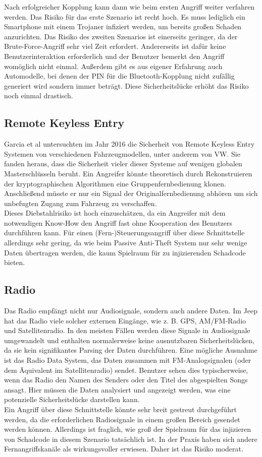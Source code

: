 Nach erfolgreicher Kopplung kann dann wie beim ersten Angriff weiter verfahren werden. 
Das Risiko für das erste Szenario ist recht hoch. Es muss lediglich ein Smartphone mit einem Trojaner infiziert werden, um bereits großen Schaden anzurichten. Das Risiko des zweiten Szenarios ist einerseits geringer, da der Brute-Force-Angriff sehr viel Zeit erfordert. Andererseits ist dafür keine Benutzerinteraktion erforderlich und der Benutzer bemerkt den Angriff womöglich nicht einmal. Außerdem gibt es aus eigener Erfahrung auch Automodelle, bei denen der PIN für die Bluetooth-Kopplung nicht zufällig generiert wird sondern immer \grqq{} beträgt. Diese Sicherheitslücke erhöht das Risiko noch einmal drastisch.


\subsection{Remote Keyless Entry}
Garcia et al untersuchten im Jahr 2016 die Sicherheit von Remote Keyless Entry Systemen von verschiedenen Fahrzeugmodellen, unter anderem von VW. Sie fanden heraus, dass die Sicherheit vieler dieser Systeme auf wenigen globalen Masterschlüsseln beruht. Ein Angreifer könnte theoretisch durch Rekonstruieren der kryptographischen Algorithmen eine Gruppenfernbedienung klonen. Anschließend müsste er nur ein Signal der Originalfernbedienung abhören um sich unbefugten Zugang zum Fahrzeug zu verschaffen. \cite{Garcia.2016}\\
Dieses Diebstahlrisiko ist hoch einzuschätzen, da ein Angreifer mit dem notwendigen Know-How den Angriff fast ohne Kooperation des Benutzers durchführen kann. Für einen (Fern-)Steuerungsangriff über diese Schnittstelle allerdings sehr gering, da wie beim Passive Anti-Theft System nur sehr wenige Daten übertragen werden, die kaum Spielraum für zu injizierenden Schadcode bieten.

\subsection{Radio}
Das Radio empfängt nicht nur Audiosignale, sondern auch andere Daten. Im Jeep hat das Radio viele solcher externen Eingänge, wie z. B. GPS, AM/FM-Radio und Satellitenradio. In den meisten Fällen werden diese Signale in Audiosignale umgewandelt und enthalten normalerweise keine ausnutzbaren Sicherheitslücken, da sie kein signifikantes Parsing der Daten durchführen. Eine mögliche Ausnahme ist das Radio Data System, das Daten zusammen mit FM-Analogsignalen (oder dem Äquivalent im Satellitenradio) sendet. Benutzer sehen dies typischerweise, wenn das Radio den Namen des Senders oder den Titel des abgespielten Songs ansagt. Hier müssen die Daten analysiert und angezeigt werden, was eine potenzielle Sicherheitslücke darstellen kann. \cite[17]{Miller.2015} \\
Ein Angriff über diese Schnittstelle könnte sehr breit gestreut durchgeführt werden, da die erforderlichen Radiosignale in einem großen Bereich gesendet werden können. Allerdings ist fraglich, wie groß der Spielraum für das injizieren von Schadcode in diesem Szenario tatsächlich ist. In der Praxis haben sich andere Fernangriffskanäle als wirkungsvoller erwiesen. Daher ist das Risiko moderat.

